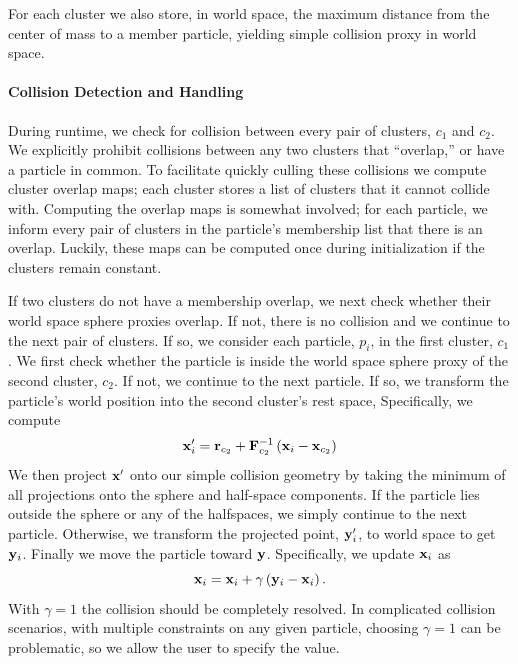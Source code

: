 \documentclass[review]{acmsiggraph}
\begin{document}
For each cluster we also store, in world space, the maximum distance from the center of mass to a member particle, yielding simple
collision proxy in world space.

\paragraph{Collision Detection and Handling}
During runtime, we check for collision between every pair of clusters, $c_1$ and $c_2$.  We explicitly prohibit collisions between
any two clusters that ``overlap,'' or have a particle in common.  To facilitate quickly culling these collisions
we compute cluster overlap maps; each cluster stores
a list of clusters that it cannot collide with.  Computing the overlap maps is somewhat involved; for each particle,
we inform every pair of clusters in the particle's membership list that there is an overlap.
Luckily, these maps can be computed once during initialization if the clusters remain constant.

If two clusters do not have a membership overlap, we next check whether their world space sphere proxies overlap.  If not, 
there is no collision and we continue to the next pair of clusters.  If so, we consider each particle, $p_i$, in the
first cluster, $c_1$.  We first check whether the particle is inside the world space sphere proxy of the second cluster, $c_2$.  If not, 
we continue to the next particle.  If so, we transform the particle's world position into the second cluster's rest space,
Specifically, we compute
\begin{equation}
\mathit{\mathbf{x}}_i^\prime = \mathit{\mathbf{r}}_{c_2} + \mathit{\mathbf{F}}_{c_2}^{-1}\left(\mathit{\mathbf{x}}_i - \mathit{\mathbf{x}}_{c_2}\right)
\end{equation}
We then project $\mathit{\mathbf{x}}^\prime$ onto our simple collision
geometry by taking the minimum of all projections onto the sphere and half-space components.  If the particle lies outside the
sphere or any of the halfspaces, we simply continue to the next particle.  Otherwise, we transform the projected point, $\mathit{\mathbf{y}}_i^\prime$,
to world space to get $\mathit{\mathbf{y}}_i$.  Finally we move the particle toward $\mathit{\mathbf{y}}$.  
Specifically, we update $\mathit{\mathbf{x}}_i$ as
\begin{equation}
\mathit{\mathbf{x}}_i = \mathit{\mathbf{x}}_i + \gamma\left(\mathit{\mathbf{y}}_i-\mathit{\mathbf{x}}_i\right).
\end{equation}
With $\gamma=1$ the collision should be completely resolved.  In complicated collision scenarios, with multiple constraints on any given
particle, choosing $\gamma=1$ can be problematic, so we allow the user to specify the value.
\end{document}
